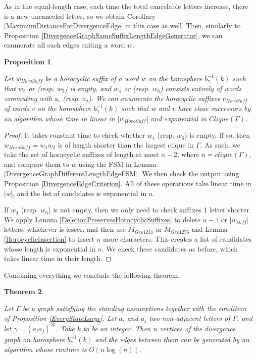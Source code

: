 \documentclass{amsart}
\newtheorem{theorem}{Theorem}[subsection]
\newtheorem{proposition}[theorem]{Proposition}
\theoremstyle{definition}
\theoremstyle{remark}
\begin{document}
	As in the equal-length case, each time the total cancelable letters increase, there is a new uncanceled letter, so we obtain Corollary \ref{MaximumDistanceForDivergenceEdge} in this case as well. Then, similarly to Proposition \ref{DivergenceGraphSameSuffixLengthEdgeGenerator}, we can enumerate all such edges exiting a word $w$.
	
	\begin{proposition}\label{DivergenceGraphDifferentSuffixLengthEdgeGenerator}
		
		Let $w_{HoroSuff}$ be a horocyclic suffix of a word $w$ on the horosphere $b_{\gamma}^{-1}(k)$ such that $w_3$ or (resp. $w_5$) is empty, and $w_4$ or (resp. $w_6$) consists entirely of words commuting with $a_i$ (resp. $a_j$). We can enumerate the horocyclic suffixes $v_{HoroSuff}$ of words $v$ on the horosphere $b_{\gamma}^{-1}(k)$ such that $w$ and $v$ have close successors by an algorithm whose time in linear in $|w_{HoroSuff}|$ and exponential in $Clique(\Gamma)$.
		
	\end{proposition}
	
	\begin{proof}
		
		It takes constant time to check whether $w_4$ (resp. $w_6$) is empty. If so, then $w_{HoroSuff}=w_1w_2$ is of length shorter than the largest clique in $\Gamma$. As such, we take the set of horocyclic suffixes of length at most $n-2$, where $n=clique(\Gamma)$, and compare them to $w$ using the FSM in Lemma \ref{DivergenceGraphDifferentLengthEdgeFSM}. We then check the output using Proposition \ref{DivergenceEdgeCriterion}. All of these operations take linear time in $|w|$, and the list of candidates is exponential in $n$.
		
		If $w_4$ (resp. $w_6$) is not empty, then we only need to check suffixes 1 letter shorter. We apply Lemma \ref{DeletionPreservesHorocyclicSuffixes} to delete $n-1$ or $|w_{suff}|$ letters, whichever is lesser, and then use $M_{Geo1234}$ or $M_{Geo1256}$ and Lemma \ref{HorocyclicInsertion} to insert $n$ more characters. This creates a list of candidates whose length is exponential in $n$. We check these candidates as before, which takes linear time in their length.
	\end{proof}
	
	Combining everything we conclude the following theorem.
	
	\begin{theorem} \label{DivergenceGraphGenerationSpeed}
		
		Let $\Gamma$ be a graph satisfying the standing assumptions together with the condition of Proposition \ref{EveryStateLarge}. Let $a_i$ and $a_j$ two non-adjacent letters of $\Gamma$, and let \newline $\gamma=(a_ia_j)^\infty$. Take $k$ to be an integer. Then $n$ vertices of the divergence graph on horosphere $b_\gamma^{-1}(k)$ and the edges between them can be generated by an algorithm whose runtime is $O(n\log(n))$.
	\end{theorem}
	
\end{document}
